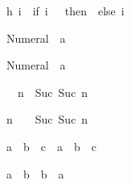 \begin{isabellebody}
{}h\ i\ {}\ {}if\ i\ {}\ {}\ then\ {}\ else\ i{}{}%
\begin{isamarkuptext}%
%
\end{isamarkuptext}%
\isamarkuptrue%
%
\begin{isamarkuptext}%
\begin{isabelle}%
Numeral{}\ {}\ {}{}{}{}a{}%
\end{isabelle}

\begin{isabelle}%
Numeral{}\ {}\ {}{}{}{}a{}%
\end{isabelle}

\begin{isabelle}%
{}\ {}\ n\ {}\ Suc\ {}Suc\ n{}%
\end{isabelle}

\begin{isabelle}%
n\ {}\ {}\ {}\ Suc\ {}Suc\ n{}%
\end{isabelle}

\begin{isabelle}%
a\ {}\ b\ {}\ c\ {}\ a\ {}\ {}b\ {}\ c{}%
\end{isabelle}

\begin{isabelle}%
a\ {}\ b\ {}\ b\ {}\ a%
\end{isabelle}


\end{isamarkuptext}
\end{isabellebody}

